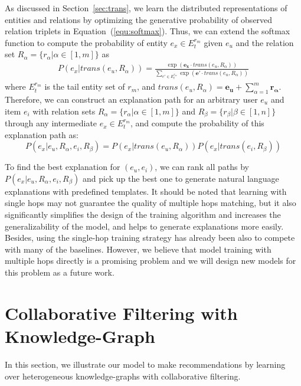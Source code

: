 \documentclass[algorithms,article,accept,moreauthors,pdftex,10pt,a4paper]{Definitions/mdpi}
\begin{document}
As discussed in Section~\ref{sec:trans}, we learn the distributed representations of entities and relations by optimizing the generative probability of observed relation triplets in Equation~(\ref{equ:softmax}). 
Thus, we can extend the softmax function to compute the probability of entity $e_x \in E_t^{r_{m}}$ given $e_u$ and the relation set $R_{\alpha} = \{r_{\alpha} | \alpha \in [1,m]\}$ as
\begin{equation}
\begin{split}
P(e_x | trans(e_u, R_{\alpha})) = \frac{\exp(\bm{e_x} \cdot trans(e_u, R_{\alpha}))}{\sum_{e' \in E_t^{r_{m}}}\exp(\bm{e'} \cdot trans(e_u, R_{\alpha}))}
\end{split}
\label{equ:one_direction_prob}
\end{equation} 
where $E_t^{r_{m}}$ is the tail entity set of $r_{m}$, and $trans(e_u, R_{\alpha}) = \bm{e_u} + \sum_{\alpha=1}^m \bm{r_{\alpha}}$.
Therefore, we can construct an explanation path for an arbitrary user $e_u$ and item $e_i$ with relation sets $R_{\alpha} = \{r_{\alpha} | \alpha \in [1,m]\}$ and $R_{\beta} = \{r_{\beta} | \beta \in [1,n]\}$ through any intermediate $e_x \in E_t^{r_{m}}$, and compute the probability of this explanation path as:
\begin{equation}
P(e_x|e_u,R_{\alpha}, e_i,R_{\beta}) \!=\! P(e_x | trans(e_u, \!R_{\alpha}))  P(e_x | trans(e_i, \!R_{\beta}))
\label{equ:path_prob}
\end{equation}

To find the best explanation for $(e_u, e_i)$, we can rank all paths by $P(e_x|e_u,R_{\alpha}, e_i,R_{\beta})$ and pick up the best one to generate natural language explanations with predefined templates. It should be noted that learning with single hops may not guarantee the quality of multiple hops matching, but it also significantly simplifies the design of the training algorithm and increases the generalizability of the model, and helps to generate explanations more easily. Besides, using the single-hop training strategy has already been also to compete with many of the baselines. However, we believe that model training with multiple hops directly is a promising problem and we will design new models for this problem as a future work.








\iffalse
\section{Collaborative Filtering with Knowledge-Graph}
In this section, we illustrate our model to make recommendations by learning over heterogeneous knowledge-graphs with collaborative filtering. 
\end{document}
